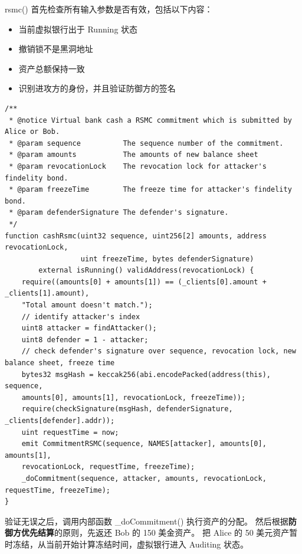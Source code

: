 \begin{appendices}
rsmc() 首先检查所有输入参数是否有效，包括以下内容：

\begin{itemize}
    \item 当前虚拟银行出于 Running 状态
    \item 撤销锁不是黑洞地址
    \item 资产总额保持一致
    \item 识别进攻方的身份，并且验证防御方的签名
\end{itemize}

\begin{lstlisting}[caption={兑现RSMC共同承诺}, label={lst:cashRsmc}]
/**
 * @notice Virtual bank cash a RSMC commitment which is submitted by Alice or Bob.
 * @param sequence          The sequence number of the commitment.
 * @param amounts           The amounts of new balance sheet
 * @param revocationLock    The revocation lock for attacker's findelity bond.
 * @param freezeTime        The freeze time for attacker's findelity bond.
 * @param defenderSignature The defender's signature.
 */
function cashRsmc(uint32 sequence, uint256[2] amounts, address revocationLock, 
                  uint freezeTime, bytes defenderSignature) 
        external isRunning() validAddress(revocationLock) {
    require((amounts[0] + amounts[1]) == (_clients[0].amount + _clients[1].amount), 
    "Total amount doesn't match.");
    // identify attacker's index
    uint8 attacker = findAttacker();
    uint8 defender = 1 - attacker;
    // check defender's signature over sequence, revocation lock, new balance sheet, freeze time
    bytes32 msgHash = keccak256(abi.encodePacked(address(this), sequence, 
    amounts[0], amounts[1], revocationLock, freezeTime));
    require(checkSignature(msgHash, defenderSignature, _clients[defender].addr));
    uint requestTime = now;
    emit CommitmentRSMC(sequence, NAMES[attacker], amounts[0], amounts[1], 
    revocationLock, requestTime, freezeTime);
    _doCommitment(sequence, attacker, amounts, revocationLock, requestTime, freezeTime);
}
\end{lstlisting}

验证无误之后，调用内部函数 \_doCommitment() 执行资产的分配。
然后根据\textbf{防御方优先结算}的原则，先返还 Bob 的 150 美金资产。
把 Alice 的 50 美元资产暂时冻结，从当前开始计算冻结时间，虚拟银行进入 Auditing 状态。


\end{appendices}
